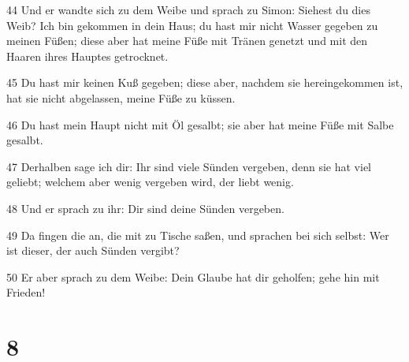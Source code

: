 \par 44 Und er wandte sich zu dem Weibe und sprach zu Simon: Siehest du dies Weib? Ich bin gekommen in dein Haus; du hast mir nicht Wasser gegeben zu meinen Füßen; diese aber hat meine Füße mit Tränen genetzt und mit den Haaren ihres Hauptes getrocknet.
\par 45 Du hast mir keinen Kuß gegeben; diese aber, nachdem sie hereingekommen ist, hat sie nicht abgelassen, meine Füße zu küssen.
\par 46 Du hast mein Haupt nicht mit Öl gesalbt; sie aber hat meine Füße mit Salbe gesalbt.
\par 47 Derhalben sage ich dir: Ihr sind viele Sünden vergeben, denn sie hat viel geliebt; welchem aber wenig vergeben wird, der liebt wenig.
\par 48 Und er sprach zu ihr: Dir sind deine Sünden vergeben.
\par 49 Da fingen die an, die mit zu Tische saßen, und sprachen bei sich selbst: Wer ist dieser, der auch Sünden vergibt?
\par 50 Er aber sprach zu dem Weibe: Dein Glaube hat dir geholfen; gehe hin mit Frieden!

\chapter{8}

